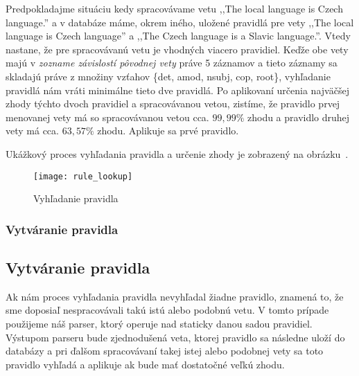 Predpokladajme situáciu kedy spracovávame vetu ,,The local language is Czech language.'' a v databáze máme, okrem iného, uložené pravidlá pre vety ,,The local language is Czech language'' a ,,The Czech language is a Slavic language.''. Vtedy nastane, že pre spracovávanú vetu je vhodných viacero pravidiel. Keďže obe vety majú v \textit{zozname závislostí pôvodnej vety} práve 5 záznamov a tieto záznamy sa skladajú práve z množiny vzťahov \{det, amod, nsubj, cop, root\}, vyhľadanie pravidlá nám vráti minimálne tieto dve pravidlá. Po aplikovaní určenia najväčšej zhody týchto dvoch pravidiel a spracovávanou vetou, zistíme, že pravidlo prvej menovanej vety má so spracovávanou vetou cca. $99,99\%$ zhodu a pravidlo druhej vety má cca. $63,57\%$ zhodu. Aplikuje sa prvé pravidlo.

Ukážkový proces vyhľadania pravidla a určenie zhody je zobrazený na obrázku~.

\begin{figure}[H]
	\begin{center}\texttt{[image: rule\_lookup]}\end{center}
	\caption[Vyhľadanie pravidla]{Vyhľadanie pravidla}\label{fig:rule_lookup}
\end{figure}

%
%
{
	\subsubsection{Vytváranie pravidla}
}
{
	\subsection{Vytváranie pravidla}
}
\label{subsubsection:rule_creation}
Ak nám proces vyhľadania pravidla nevyhľadal žiadne pravidlo, znamená to, že sme doposiaľ nespracovávali takú istú alebo podobnú vetu. V tomto prípade použijeme náš parser, ktorý operuje nad staticky danou sadou pravidiel. Výstupom parseru bude zjednodušená veta, ktorej pravidlo sa následne uloží do databázy a pri ďalšom spracovávaní takej istej alebo podobnej vety sa toto pravidlo vyhľadá a aplikuje ak bude mať dostatočné veľkú zhodu.


